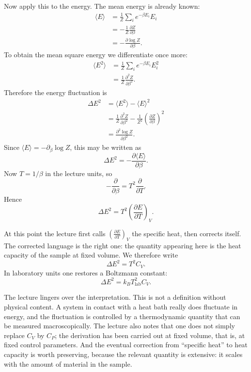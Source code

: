 Now apply this to the energy. The mean energy is already known:
\begin{align}
\langle E\rangle
&=
\frac{1}{Z}\sum_i e^{-\beta E_i}E_i \\
&=
-\frac{1}{Z}\frac{\partial Z}{\partial \beta} \\
&=
-\frac{\partial \log Z}{\partial \beta}.
\end{align}
To obtain the mean square energy we differentiate once more:
\begin{align}
\langle E^2\rangle
&=
\frac{1}{Z}\sum_i e^{-\beta E_i}E_i^2 \\
&=
\frac{1}{Z}\frac{\partial^2 Z}{\partial \beta^2}.
\end{align}
Therefore the energy fluctuation is
\begin{align}
\Delta E^2
&=
\langle E^2\rangle-\langle E\rangle^2 \\
&=
\frac{1}{Z}\frac{\partial^2 Z}{\partial \beta^2}
-
\frac{1}{Z^2}\left(\frac{\partial Z}{\partial \beta}\right)^2 \\
&=
\frac{\partial^2 \log Z}{\partial \beta^2}.
\end{align}
Since \(\langle E\rangle=-\partial_\beta \log Z\), this may be written as
\begin{equation}
\Delta E^2=-\frac{\partial \langle E\rangle}{\partial \beta}.
\end{equation}
Now \(T=1/\beta\) in the lecture units, so
\begin{equation}
-\frac{\partial}{\partial \beta}
=
T^2\frac{\partial}{\partial T}.
\end{equation}
Hence
\begin{equation}
\Delta E^2
=
T^2\left(\frac{\partial E}{\partial T}\right)_V.
\end{equation}

At this point the lecture first calls \(\left(\frac{\partial E}{\partial T}\right)_V\) the specific heat, then corrects itself. The corrected language is the right one: the quantity appearing here is the heat capacity of the sample at fixed volume. We therefore write
\begin{equation}
\Delta E^2=T^2 C_V.
\end{equation}
In laboratory units one restores a Boltzmann constant:
\begin{equation}
\Delta E^2=k_B T_{\mathrm{lab}}^2 C_V.
\end{equation}

The lecture lingers over the interpretation. This is not a definition without physical content. A system in contact with a heat bath really does fluctuate in energy, and the fluctuation is controlled by a thermodynamic quantity that can be measured macroscopically. The lecture also notes that one does not simply replace \(C_V\) by \(C_P\); the derivation has been carried out at fixed volume, that is, at fixed control parameters. And the eventual correction from ``specific heat'' to heat capacity is worth preserving, because the relevant quantity is extensive: it scales with the amount of material in the sample.

